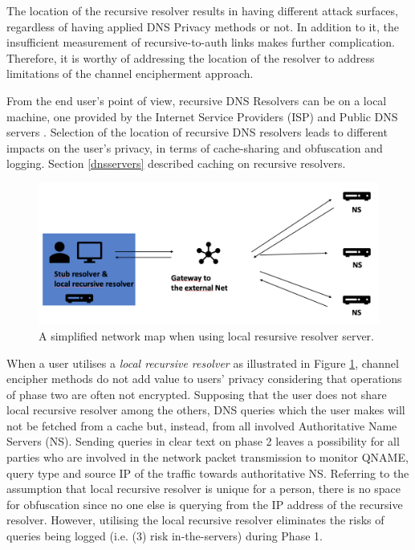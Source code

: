 The location of the recursive resolver results in having different attack surfaces, regardless of having applied DNS Privacy methods or not.
In addition to it, the insufficient measurement of recursive-to-auth links makes further complication. Therefore, it is worthy of addressing the location of the resolver to address limitations of the channel encipherment approach.

From the end user's point of view, recursive DNS Resolvers can be on a local machine, one provided by the Internet Service Providers (ISP) and Public DNS servers \cite{van2018privacy}.
Selection of the location of recursive DNS resolvers leads to different impacts on the user's privacy, in terms of cache-sharing\cite{van2018privacy, wang2013analysis} and obfuscation and logging. Section \ref{dnsservers} described caching on recursive resolvers.

\begin{figure}[ht!]
    \begin{center}
    \includegraphics*[width=0.9\columnwidth]{img/local-recursive}
    \end{center}
    \caption{A simplified network map when using local resursive resolver server.}
    \label{localrecursive}
\end{figure}
When a user utilises a \textit{local recursive resolver} as illustrated in Figure \ref{localrecursive}, channel encipher methods do not add value to users' privacy considering that operations of phase two are often not encrypted.
Supposing that the user does not share local recursive resolver among the others, DNS queries which the user makes will not be fetched from a cache but, instead, from all involved Authoritative Name Servers (NS).
Sending queries in clear text on phase 2 leaves a possibility for all parties who are involved in the network packet transmission to monitor QNAME, query type and source IP of the traffic towards authoritative NS.
Referring to the assumption that local recursive resolver is unique for a person, there is no space for obfuscation since no one else is querying from the IP address of the recursive resolver.
However, utilising the local recursive resolver eliminates the risks of queries being logged (i.e. (3) risk in-the-servers) during Phase 1.



